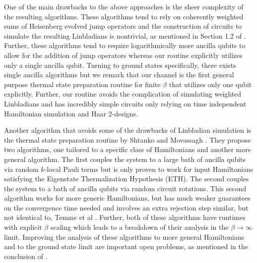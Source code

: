 One of the main drawbacks to the above approaches is the sheer complexity of the resulting algorithms. These algorithms tend to rely on coherently weighted sums of Heisenberg evolved jump operators and the construction of circuits to simulate the resulting Linbladians is nontrivial, as mentioned in Section 1.2 of \cite{gilyen2024quantumgeneralizationsglaubermetropolis}. Further, these algorithms tend to require logarithmically more ancilla qubits to allow for the addition of jump operators whereas our routine explicitly utilizes only a single ancilla qubit. Turning to ground states specifically, there exists single ancilla algorithms \cite{ding2024single}  but we remark that our channel is the first general purpose thermal state preparation routine for finite $\beta$ that utilizes only one qubit explicitly. Further, our routine avoids the complication of simulating weighted Linbladians and has incredibly simple circuits only relying on time independent Hamiltonian simulation and Haar 2-designs. 

Another algorithm that avoids some of the drawbacks of Linbladian simulation is the thermal state preparation routine by Shtanko and Movassagh \cite{shtanko2023preparingthermalstatesnoiseless}. They propose two algorithms, one tailored to a specific class of Hamiltonians and another more general algorithm. The first couples the system to a large bath of ancilla qubits via random $k$-local Pauli terms but is only proven to work for input Hamiltonians satisfying the Eigenstate Thermalization Hypothesis (ETH). The second couples the system to a bath of ancilla qubits via random circuit rotations. This second algorithm works for more generic Hamiltonians, but has much weaker guarantees on the convergence time needed and involves an extra rejection step similar, but not identical to, Temme et al \cite{temme2011}. Further, both of these algorithms have runtimes with explicit $\beta$ scaling which leads to a breakdown of their analysis in the $\beta \to \infty$ limit. Improving the analysis of these algorithms to more general Hamiltonians and to the ground state limit are important open problems, as mentioned in the conclusion of \cite{shtanko2023preparingthermalstatesnoiseless}.

